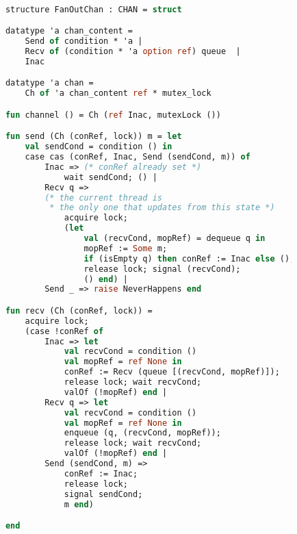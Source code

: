 \documentclass{article}
\begin{document}
        \begin{lstlisting}[language=ML, style=codestyle1]

            structure FanOutChan : CHAN = struct

            datatype 'a chan_content =
                Send of condition * 'a |
                Recv of (condition * 'a option ref) queue  |
                Inac

            datatype 'a chan =
                Ch of 'a chan_content ref * mutex_lock

            fun channel () = Ch (ref Inac, mutexLock ())

            fun send (Ch (conRef, lock)) m = let
                val sendCond = condition () in
                case cas (conRef, Inac, Send (sendCond, m)) of
                    Inac => (* conRef already set *)
                        wait sendCond; () |
                    Recv q => 
                    (* the current thread is
                     * the only one that updates from this state *)
                        acquire lock;
                        (let
                            val (recvCond, mopRef) = dequeue q in
                            mopRef := Some m; 
                            if (isEmpty q) then conRef := Inac else (); 
                            release lock; signal (recvCond);
                            () end) |
                    Send _ => raise NeverHappens end

            fun recv (Ch (conRef, lock)) =
                acquire lock;
                (case !conRef of
                    Inac => let
                        val recvCond = condition ()
                        val mopRef = ref None in
                        conRef := Recv (queue [(recvCond, mopRef)]);
                        release lock; wait recvCond;
                        valOf (!mopRef) end |
                    Recv q => let
                        val recvCond = condition () 
                        val mopRef = ref None in
                        enqueue (q, (recvCond, mopRef));
                        release lock; wait recvCond;
                        valOf (!mopRef) end |
                    Send (sendCond, m) =>
                        conRef := Inac;
                        release lock;
                        signal sendCond;
                        m end) 

            end 
        \end{lstlisting}
\end{document}
